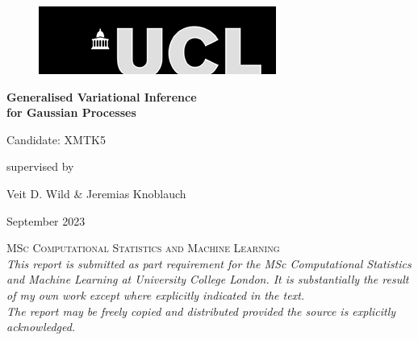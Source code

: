 \documentclass{article}
\numberwithin{equation}{section}
\begin{document}
\onehalfspacing
\begin{titlepage}
	\centering
\begin{figure}[h!]
\begin{flushright}
    \includegraphics[width=.333\textwidth]{thesis_report/figures/ucl_logo.png}
\end{flushright}
\end{figure}
    {}
	\vspace{3cm}

	{\Huge\bfseries Generalised Variational Inference \\ for Gaussian Processes\par}

	\vspace{1cm}
	{\LARGE Candidate: XMTK5\par}
    \vspace{0.5cm}
	supervised by\par
    \Large{Veit D. Wild \& Jeremias Knoblauch}\\
	\vfill
	{\large September 2023\par}
 \textsc{MSc Computational Statistics and Machine Learning}\\
	\vspace{1cm}
 \textit{\scriptsize{This report is submitted as part requirement for the MSc Computational Statistics and Machine Learning at University College London. It is substantially the result of my own work except where explicitly indicated in the text. \\ The report may be freely copied and distributed provided the source is explicitly acknowledged.}}


\end{titlepage}
\newpage
\setcounter{page}{1}


\end{document}
